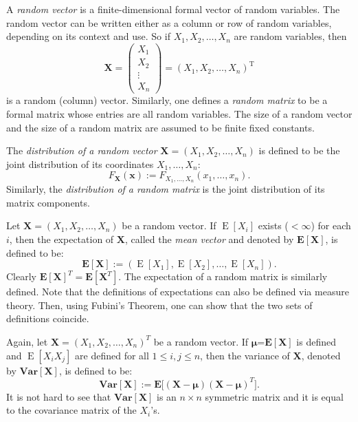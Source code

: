 \documentclass[12pt]{article}
\newcommand{\trnsp}[1]{#1^{\operatorname{T}}}
\begin{document}
A \emph{random vector} is a finite-dimensional formal vector of
random variables.  The random vector can be written either as a
column or row of random variables, depending on its context and use.
So if $X_1,X_2,\ldots,X_n$ are random variables, then
$$\textbf{X}=\begin{pmatrix} X_1 \\ X_2 \\
\vdots \\ X_n \end{pmatrix}=\trnsp{(X_1,X_2,\ldots,X_n)}$$ is a
random (column) vector.  Similarly, one defines a \emph{random
matrix} to be a formal matrix whose entries are all random
variables.  The size of a random vector and the size of a
random matrix are assumed to be finite fixed constants.

The \emph{distribution of a random vector}
$\textbf{X}=(X_1,X_2,\ldots,X_n)$ is defined to be the joint
distribution of its coordinates $X_1,\ldots,X_n$:
$$F_{\textbf{X}}(\textbf{x}):=F_{X_1,\ldots,X_n}(x_1,\ldots,x_n).$$
Similarly, the \emph{distribution of a random matrix} is the joint
distribution of its matrix components.

Let $\textbf{X}=(X_1,X_2,\ldots,X_n)$ be a random vector.  If
$\operatorname{E}[X_i]$ exists ($<\infty$) for each $i$, then the expectation of
$\textbf{X}$, called the \emph{mean vector} and denoted by
$\mathbf{E}[\textbf{X}]$, is defined to be:
$$\mathbf{E}[\textbf{X}]:=(\operatorname{E}[X_1],\operatorname{E}[X_2],\ldots, \operatorname{E}[X_n]).$$
Clearly $\mathbf{E}[\textbf{X}]^T=\mathbf{E}[\textbf{X}^T]$. The
expectation of a random matrix is similarly defined.  Note that the
definitions of expectations can also be defined via measure theory.  Then,
using Fubini's Theorem, one can show that the two sets of definitions coincide.

Again, let $\textbf{X}=(X_1,X_2,\ldots,X_n)^T$ be a random vector.
If $\boldsymbol{\mu}$=$\mathbf{E}[\textbf{X}]$ is defined and
$\operatorname{E}[X_iX_j]$ are defined for all $1\leq i,j \leq n$, then the
variance of $\textbf{X}$, denoted by $\textbf{Var}[\textbf{X}]$, is
defined to be:
$$\textbf{Var}[\textbf{X}]:= \mathbf{E}\big[(\textbf{X}-\boldsymbol{\mu})(\textbf{X}-\boldsymbol{\mu})^T\big].$$
It is not hard to see that $\textbf{Var}[\textbf{X}]$ is an $n\times
n$ symmetric matrix and it is equal to the covariance matrix of the
$X_i$'s.
\end{document}
